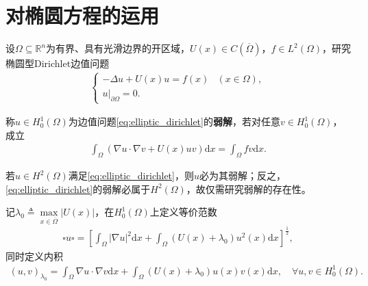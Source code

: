 \documentclass[../../main.tex]{subfiles}%
\begin{document}
\section{对椭圆方程的运用}

\begin{examples}
设$\Omega\subseteq\mathbb{R}^n$为有界、具有光滑边界的开区域，$U(x)\in C(\overline{\Omega})$，$f\in L^2(\Omega)$，研究椭圆型Dirichlet边值问题
\begin{align}
\begin{cases}
-\Delta u+U(x)u=f(x) &(x\in\Omega),\\
u|_{\partial\Omega}=0.
\end{cases}
\label{eq:elliptic_dirichlet}
\end{align}
\end{examples}

\begin{definition}
称$u\in H_0^1(\Omega)$为边值问题\eqref{eq:elliptic_dirichlet}的\textbf{弱解}，若对任意$v\in H_0^1(\Omega)$，成立
\begin{align}
\int_{\Omega}\left(\nabla u\cdot\nabla v+U(x)uv\right)\mathrm{d}x=\int_{\Omega}fv\mathrm{d}x.
\label{eq:weak_sol}
\end{align}
\end{definition}

\begin{remark}
若$u\in H^2(\Omega)$满足\eqref{eq:elliptic_dirichlet}，则$u$必为其弱解；反之，\eqref{eq:elliptic_dirichlet}的弱解必属于$H^2(\Omega)$，故仅需研究弱解的存在性。
\end{remark}

\begin{definition}
记$\lambda_0\triangleq\max\limits_{x\in\overline{\Omega}}|U(x)|$，在$H_0^1(\Omega)$上定义等价范数
\begin{align*}
\square u\square=\left[\int_{\Omega}|\nabla u|^2\mathrm{d}x+\int_{\Omega}\left(U(x)+\lambda_0\right)u^2(x)\mathrm{d}x\right]^{\frac12},
\end{align*}
同时定义内积
\begin{align}
(u,v)_{\lambda_0}=\int_{\Omega}\nabla u\cdot\nabla v\mathrm{d}x+\int_{\Omega}\left(U(x)+\lambda_0\right)u(x)v(x)\mathrm{d}x,\quad \forall u,v\in H_0^1(\Omega).
\label{eq:inner_lambda0}
\end{align}
\end{definition}
\end{document}
